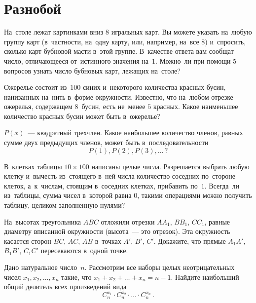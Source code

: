 
\section*{Разнобой}


\begin{problems}

\item
На~столе лежат картинками вниз $8$ игральных карт.
Вы можете указать на~любую группу карт (в~частности, на~одну карту, или,
например, на~все $8$) и~спросить, сколько карт бубновой масти в~этой группе.
В~качестве ответа вам сообщат число, отличающееся от~истинного значения на~$1$.
Можно~ли при помощи $5$ вопросов узнать число бубновых карт, лежащих на~столе?

\item
Ожерелье состоит из~$100$ синих и~некоторого количества красных бусин,
нанизанных на~нить в~форме окружности.
Известно, что на~любом отрезке ожерелья, содержащем $8$~бусин, есть не~менее
$5$ красных.
Какое наименьшее количество красных бусин может быть в~ожерелье?

\item
$P(x)$~--- квадратный трехчлен.
Какое наибольшее количество членов, равных сумме двух предыдущих членов, может
быть в~последовательности
\[
    P(1), P(2), P(3), \ldots
\, ? \]

\item
В~клетках таблицы $10 \times 100$ написаны целые числа.
Разрешается выбрать любую клетку и~вычесть из~стоящего в~ней числа количество
соседних по~стороне клеток, а~к~числам, стоящим в~соседних клетках, прибавить
по~$1$.
Всегда~ли из~таблицы, сумма чисел в~которой равна $0$, такими операциями можно
получить таблицу, целиком заполненную нулями?

\item
На~высотах треугольника $ABC$ отложили отрезки $A A_1$, $B B_1$, $C C_1$,
равные диаметру вписанной окружности (высота~--- это отрезок).
Эта окружность касается сторон $BC$, $AC$, $AB$ в~точках $A'$, $B'$, $C'$.
Докажите, что прямые $A_1 A'$, $B_1 B'$, $C_1 C'$ пересекаются в~одной точке.

\item
Дано натуральное число~$n$.
Рассмотрим все наборы целых неотрицательных чисел $x_1, x_2, \ldots, x_n$
такие, что $x_{1} + x_{2} + \ldots + x_{n} = n - 1$.
Найдите наибольший общий делитель всех произведений вида
\[
    C_{n}^{x_{1}} \cdot
    C_{n}^{x_{2}} \cdot
    \ldots \cdot
    C_{n}^{x_{n}}
\, . \]

\end{problems}

